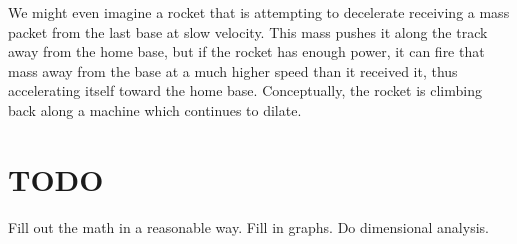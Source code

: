 \documentclass[11pt]{article}
\begin{document}
We might even imagine a rocket that is attempting to decelerate receiving
a mass packet from the last base at slow velocity.  This mass pushes it along
the track away from the home base, but if the rocket has enough power, it can
fire that mass away from the base at a much higher speed than it received it,
thus accelerating itself toward the home base. Conceptually, the rocket is
climbing back along a machine which continues to dilate.


\section{TODO}

Fill out the math in a reasonable way.  Fill in graphs. Do dimensional analysis.
\end{document}
